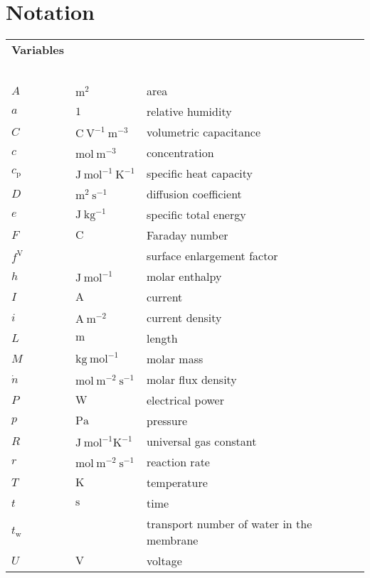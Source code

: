 \newpage
%
\section{Notation}
\label{section:notation}
%
%

\begin{longtable}	{p{3cm} p{3cm} p{8cm}}
	\textbf{Variables} & ~ & ~ \\
	~ & ~ & ~ \\
	$A$ & $\mathrm{m^2}$ & area \\
	$a$ & $1$ & relative humidity \\
	$C$ & $\mathrm{C ~V^{-1} ~m^{-3}}$ & volumetric capacitance \\
	$c$ & $\mathrm{mol ~m^{-3}}$ & concentration \\
	$c_{\mathrm{p}}$ & $\mathrm{J ~mol^{-1} ~K^{-1}}$ & specific heat capacity \\
	$D$ & $\mathrm{m^2 ~s^{-1}}$ & diffusion coefficient \\
	$e$ & $\mathrm{J ~kg^{-1}}$ & specific total energy \\
	$F$ & $\mathrm{C}$ & Faraday number \\
	$f^{\mathrm{V}}$ & ~ & surface enlargement factor \\
	$h$ & $\mathrm{J ~mol^{-1}}$ & molar enthalpy \\
	$I$ & $\mathrm{A}$ & current \\
	$i$ & $\mathrm{A ~m^{-2}}$ & current density \\
	$L$ & $\mathrm{m}$ & length \\
	$M$ & $\mathrm{kg ~mol^{-1}}$ & molar mass \\
	$\dot{n}$ & $\mathrm{mol ~m^{-2} ~s^{-1}}$ & molar flux density \\
	$P$ & $\mathrm{W}$ & electrical power \\
	$p$ & $\mathrm{Pa}$ & pressure \\
	$R$ & $\mathrm{J ~mol^{-1} K^{-1}}$ & universal gas constant \\
	$r$ & $\mathrm{mol ~m^{-2} ~s^{-1}}$ & reaction rate \\
	$T$ & $\mathrm{K}$ & temperature \\
	$t$ & $\mathrm{s}$ & time \\
	$t_{\mathrm{w}}$ & $~$ & transport number of water in the membrane \\
	$U$ & $\mathrm{V}$ & voltage \\

\end{longtable}
